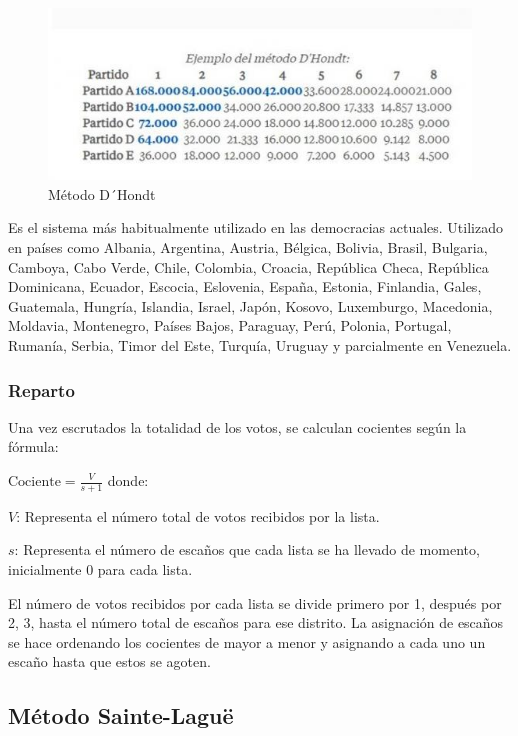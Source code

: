 \documentclass[12pt,a4paper,]{book}
\numberwithin{dummy}{section}
\theoremstyle{ocrenumbox}
\theoremstyle{blacknumex}
\theoremstyle{blacknumbox}
\theoremstyle{ocrenum}
\theoremstyle{ocrenum}
\begin{document}
\begin{figure}[H]

{\centering \includegraphics[width=1\linewidth]{graficos/vanguardia} 

}

\caption{Método D´Hondt}\label{fig:pressure}
\end{figure}

Es el sistema más habitualmente utilizado en las democracias actuales.
Utilizado en países como Albania, Argentina, Austria, Bélgica, Bolivia,
Brasil, Bulgaria, Camboya, Cabo Verde, Chile, Colombia, Croacia,
República Checa, República Dominicana, Ecuador, Escocia, Eslovenia,
España, Estonia, Finlandia, Gales, Guatemala, Hungría, Islandia, Israel,
Japón, Kosovo, Luxemburgo, Macedonia, Moldavia, Montenegro, Países
Bajos, Paraguay, Perú, Polonia, Portugal, Rumanía, Serbia, Timor del
Este, Turquía, Uruguay y parcialmente en Venezuela.

\hypertarget{reparto}{%
\subsubsection{Reparto}\label{reparto}}

Una vez escrutados la totalidad de los votos, se calculan cocientes
según la fórmula:

\(\textrm{Cociente} = \frac{V}{s+1}\) donde:

\(V\): Representa el número total de votos recibidos por la lista.

\(s\): Representa el número de escaños que cada lista se ha llevado de
momento, inicialmente 0 para cada lista.

El número de votos recibidos por cada lista se divide primero por 1,
después por 2, 3, hasta el número total de escaños para ese distrito. La
asignación de escaños se hace ordenando los cocientes de mayor a menor y
asignando a cada uno un escaño hasta que estos se agoten.

\hypertarget{muxe9todo-sainte-laguuxeb}{%
\subsection{Método Sainte-Laguë}\label{muxe9todo-sainte-laguuxeb}}
\end{document}
